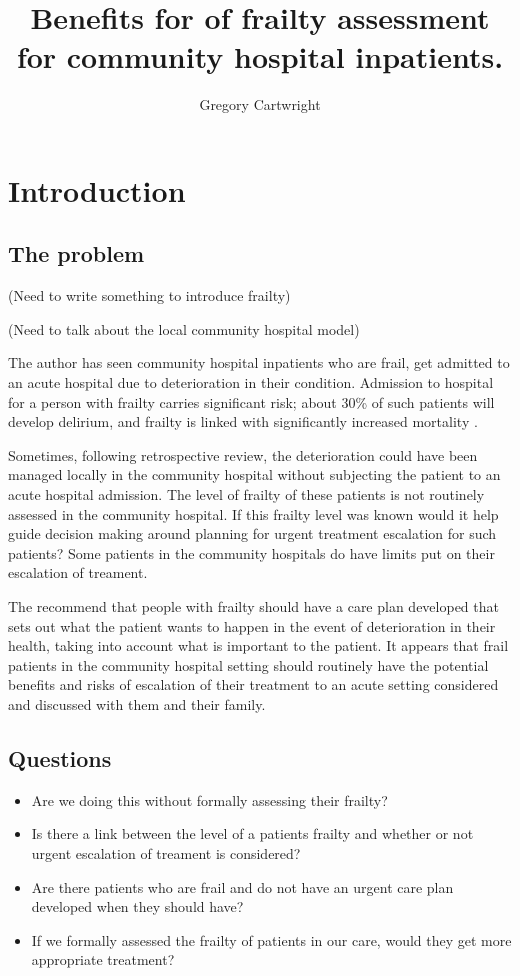 \documentclass[12pt,a4paper,oneside,titlepage]{article}
\begin{document}
\author{Gregory Cartwright}
\title{Benefits for of frailty assessment for community hospital inpatients.}
\section*{Introduction}

\subsection*{The problem}
(Need to write something to introduce frailty)

(Need to talk about the local community hospital model)

The author has seen community hospital inpatients who are frail, get admitted to an acute hospital due to deterioration in their condition. Admission to hospital for a person with frailty carries significant risk; about 30\% of such patients will develop delirium,  and frailty is linked with significantly increased mortality \parencite{clegg:13, eeles:12}.


Sometimes, following retrospective review,  the deterioration could have been managed locally in the community hospital without subjecting the patient to an acute hospital admission. 
The level of frailty of these patients is not routinely assessed in the community hospital.
If this frailty level was known would it help guide decision making around planning for urgent treatment escalation for such patients?
Some patients in the community hospitals do have limits put on their escalation of treament. 

The \textcite{bgs:14} recommend that people with frailty should have a care plan developed that sets out what the patient wants to happen in the event of deterioration in their health, taking into account what is important to the patient.
It appears that frail patients in the community hospital setting should routinely have the potential benefits and risks of escalation of their treatment to an acute setting considered and discussed with them and their family.

\subsection*{Questions}
\begin{itemize}
\item Are we doing this without formally assessing their frailty?
\item Is there a link between the level of a patients frailty and whether or not urgent escalation of treament is considered?
\item Are there patients who are frail and do not have an urgent care plan developed when they should have?
\item If we formally assessed the frailty of patients in our care, would they get more appropriate treatment?
\end{itemize}
\end{document}
